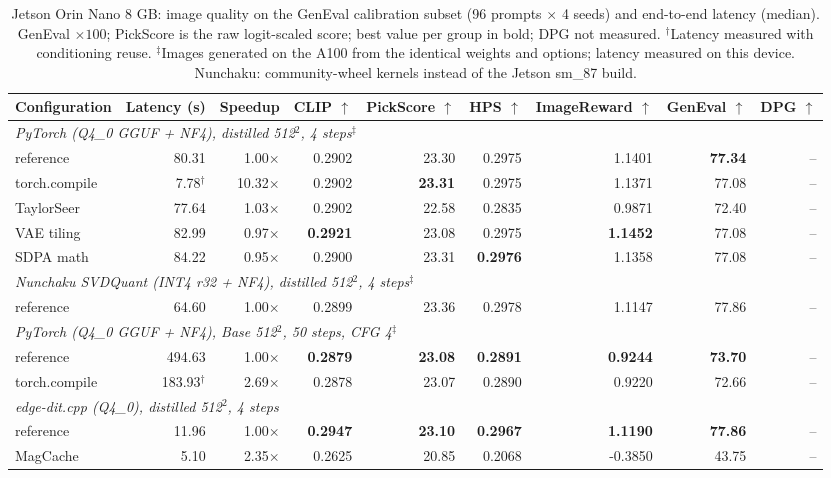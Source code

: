 \begin{table}[t]
\centering
\small
\begin{tabular}{lrrrrrrrr}
\toprule
\textbf{Configuration} & \textbf{Latency (s)} & \textbf{Speedup} & \textbf{CLIP $\uparrow$} & \textbf{PickScore $\uparrow$} & \textbf{HPS $\uparrow$} & \textbf{ImageReward $\uparrow$} & \textbf{GenEval $\uparrow$} & \textbf{DPG $\uparrow$} \\
\midrule
\multicolumn{9}{l}{\textit{PyTorch (Q4_0 GGUF + NF4), distilled 512$^2$, 4 steps}$^\ddagger$} \\
\quad reference & 80.31 & 1.00$\times$ & 0.2902 & 23.30 & 0.2975 & 1.1401 & \textbf{77.34} & – \\
\quad torch.compile & 7.78$^\dagger$ & 10.32$\times$ & 0.2902 & \textbf{23.31} & 0.2975 & 1.1371 & 77.08 & – \\
\quad TaylorSeer & 77.64 & 1.03$\times$ & 0.2902 & 22.58 & 0.2835 & 0.9871 & 72.40 & – \\
\quad VAE tiling & 82.99 & 0.97$\times$ & \textbf{0.2921} & 23.08 & 0.2975 & \textbf{1.1452} & 77.08 & – \\
\quad SDPA math & 84.22 & 0.95$\times$ & 0.2900 & 23.31 & \textbf{0.2976} & 1.1358 & 77.08 & – \\
\midrule
\multicolumn{9}{l}{\textit{Nunchaku SVDQuant (INT4 r32 + NF4), distilled 512$^2$, 4 steps}$^\ddagger$} \\
\quad reference & 64.60 & 1.00$\times$ & 0.2899 & 23.36 & 0.2978 & 1.1147 & 77.86 & – \\
\midrule
\multicolumn{9}{l}{\textit{PyTorch (Q4_0 GGUF + NF4), Base 512$^2$, 50 steps, CFG 4}$^\ddagger$} \\
\quad reference & 494.63 & 1.00$\times$ & \textbf{0.2879} & \textbf{23.08} & \textbf{0.2891} & \textbf{0.9244} & \textbf{73.70} & – \\
\quad torch.compile & 183.93$^\dagger$ & 2.69$\times$ & 0.2878 & 23.07 & 0.2890 & 0.9220 & 72.66 & – \\
\midrule
\multicolumn{9}{l}{\textit{edge-dit.cpp (Q4_0), distilled 512$^2$, 4 steps}} \\
\quad reference & 11.96 & 1.00$\times$ & \textbf{0.2947} & \textbf{23.10} & \textbf{0.2967} & \textbf{1.1190} & \textbf{77.86} & – \\
\quad MagCache & 5.10 & 2.35$\times$ & 0.2625 & 20.85 & 0.2068 & -0.3850 & 43.75 & – \\
\bottomrule
\end{tabular}
\caption{Jetson Orin Nano 8 GB: image quality on the GenEval calibration subset (96 prompts $\times$ 4 seeds) and end-to-end latency (median). GenEval $\times 100$; PickScore is the raw logit-scaled score; best value per group in bold; DPG not measured. $^\dagger$Latency measured with conditioning reuse. $^\ddagger$Images generated on the A100 from the identical weights and options; latency measured on this device. Nunchaku: community-wheel kernels instead of the Jetson sm\_87 build.}
\end{table}

